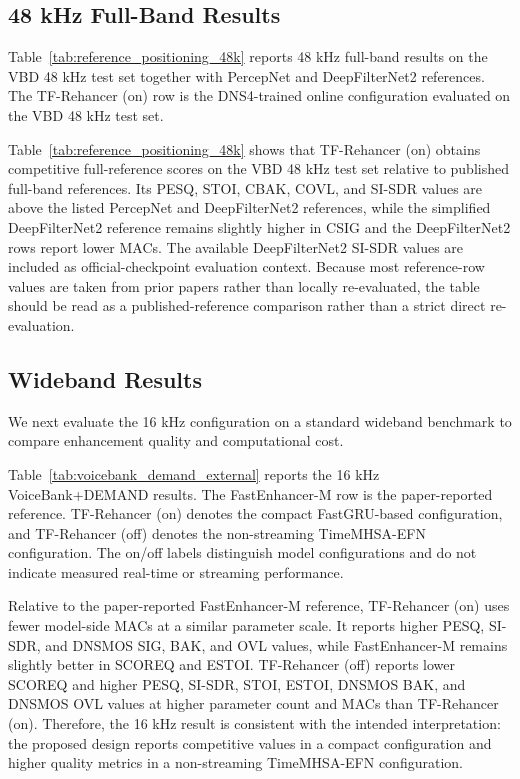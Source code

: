 \subsection{48 kHz Full-Band Results}
\label{sec:exp_48k_fullband_results}

Table~\ref{tab:reference_positioning_48k} reports 48 kHz full-band results on the VBD 48 kHz test set together with PercepNet and DeepFilterNet2 references. The TF-Rehancer (on) row is the DNS4-trained online configuration evaluated on the VBD 48 kHz test set.



Table~\ref{tab:reference_positioning_48k} shows that TF-Rehancer (on) obtains competitive full-reference scores on the VBD 48 kHz test set relative to published full-band references. Its PESQ, STOI, CBAK, COVL, and SI-SDR values are above the listed PercepNet and DeepFilterNet2 references, while the simplified DeepFilterNet2 reference remains slightly higher in CSIG and the DeepFilterNet2 rows report lower MACs. The available DeepFilterNet2 SI-SDR values are included as official-checkpoint evaluation context. Because most reference-row values are taken from prior papers rather than locally re-evaluated, the table should be read as a published-reference comparison rather than a strict direct re-evaluation.

\subsection{Wideband Results}
\label{sec:exp_16k_efficiency}

We next evaluate the 16 kHz configuration on a standard wideband benchmark to compare enhancement quality and computational cost.

Table~\ref{tab:voicebank_demand_external} reports the 16 kHz VoiceBank+DEMAND results. The FastEnhancer-M row is the paper-reported reference. TF-Rehancer (on) denotes the compact FastGRU-based configuration, and TF-Rehancer (off) denotes the non-streaming TimeMHSA-EFN configuration. The on/off labels distinguish model configurations and do not indicate measured real-time or streaming performance.



Relative to the paper-reported FastEnhancer-M reference, TF-Rehancer (on) uses fewer model-side MACs at a similar parameter scale. It reports higher PESQ, SI-SDR, and DNSMOS SIG, BAK, and OVL values, while FastEnhancer-M remains slightly better in SCOREQ and ESTOI. TF-Rehancer (off) reports lower SCOREQ and higher PESQ, SI-SDR, STOI, ESTOI, DNSMOS BAK, and DNSMOS OVL values at higher parameter count and MACs than TF-Rehancer (on). Therefore, the 16 kHz result is consistent with the intended interpretation: the proposed design reports competitive values in a compact configuration and higher quality metrics in a non-streaming TimeMHSA-EFN configuration.

